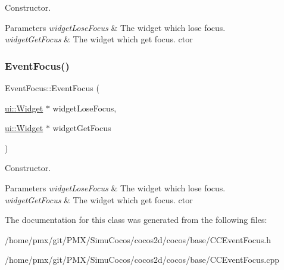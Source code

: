 Constructor.


\begin{DoxyParams}{Parameters}
{\em widget\+Lose\+Focus} & The widget which lose focus. \\
\hline
{\em widget\+Get\+Focus} & The widget which get focus.  ctor \\
\hline
\end{DoxyParams}
\mbox{\label{classEventFocus_ac1ec32650429e3751658af171b495a2f}} 
\subsubsection{\texorpdfstring{Event\+Focus()}{EventFocus()}\hspace{0.1cm}{\footnotesize\ttfamily [2/2]}}
{\footnotesize\ttfamily Event\+Focus\+::\+Event\+Focus (\begin{DoxyParamCaption}\item[{\hyperlink{classui_1_1Widget}{ui\+::\+Widget} $\ast$}]{widget\+Lose\+Focus,  }\item[{\hyperlink{classui_1_1Widget}{ui\+::\+Widget} $\ast$}]{widget\+Get\+Focus }\end{DoxyParamCaption})}

Constructor.


\begin{DoxyParams}{Parameters}
{\em widget\+Lose\+Focus} & The widget which lose focus. \\
\hline
{\em widget\+Get\+Focus} & The widget which get focus.  ctor \\
\hline
\end{DoxyParams}


The documentation for this class was generated from the following files\+:\begin{DoxyCompactItemize}
\item 
/home/pmx/git/\+P\+M\+X/\+Simu\+Cocos/cocos2d/cocos/base/C\+C\+Event\+Focus.\+h\item 
/home/pmx/git/\+P\+M\+X/\+Simu\+Cocos/cocos2d/cocos/base/C\+C\+Event\+Focus.\+cpp\end{DoxyCompactItemize}
